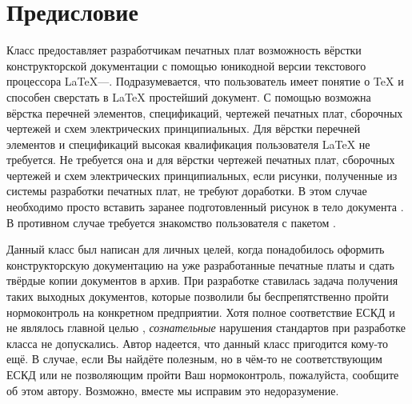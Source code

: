
\section{Предисловие}

Класс  предоставляет разработчикам печатных плат возможность
вёрстки конструкторской документации с помощью юникодной версии текстового
процессора \LaTeX{}---\XeLaTeX{}. Подразумевается, что пользователь
имеет понятие о \TeX{} и способен сверстать в \LaTeX{} простейший
документ. С помощью  возможна вёрстка перечней элементов,
спецификаций, чертежей печатных плат, сборочных чертежей и схем электрических
принципиальных. Для вёрстки перечней элементов и спецификаций высокая
квалификация пользователя \LaTeX{} не требуется. Не требуется она и для
вёрстки чертежей печатных плат, сборочных чертежей и схем электрических
принципиальных, если рисунки, полученные из системы разработки печатных плат, не
требуют доработки. В этом случае необходимо просто вставить заранее
подготовленный рисунок в тело документа . В противном случае
требуется знакомство пользователя с пакетом .

Данный класс был написан для личных целей, когда понадобилось оформить
конструкторскую документацию на уже разработанные печатные платы и сдать твёрдые
копии документов в архив. При разработке  ставилась задача
получения таких выходных документов, которые позволили бы беспрепятственно
пройти нормоконтроль на конкретном предприятии. Хотя полное соответствие ЕСКД и
не являлось главной целью , \emph{сознательные} нарушения
стандартов при разработке класса не допускались. Автор надеется, что данный
класс пригодится кому-то ещё. В случае, если Вы найдёте 
полезным, но в чём-то не соответствующим ЕСКД или не позволяющим пройти Ваш
нормоконтроль, пожалуйста, сообщите об этом автору. Возможно, вместе мы исправим
это недоразумение.
